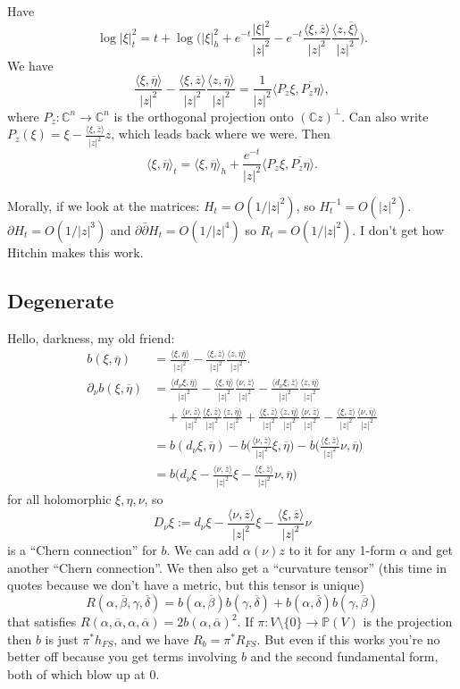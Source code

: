 \documentclass[10pt,a4paper]{amsart}
\newcommand{\kk}[1]{\mathbb{#1}}
\def\<{\langle}
\def\>{\rangle}
\def\ov#1{\overline{#1}}
\begin{document}
Have
$$
\log |\xi|^2_t
= t + \log\biggl(
|\xi|^2_h
+ e^{-t} \frac{|\xi|^2}{|z|^2}
- e^{-t} \frac{\<\xi, \ov z\>}{|z|^2}
\frac{\<z, \ov\xi\>}{|z|^2}
\biggr).
$$
We have
$$
\frac{\<\xi, \ov\eta\>}{|z|^2}
- \frac{\<\xi, \ov z\>}{|z|^2}
\frac{\<z, \ov \eta\>}{|z|^2}
= \frac{1}{|z|^2} \< P_z\xi, \ov{P_z\eta} \>,
$$
where $P_z : \kk C^n \to \kk C^n$ is the orthogonal projection onto $(\kk
C z)^\perp$.
Can also write $P_z(\xi) = \xi - \frac{\<\xi, \ov z\>}{|z|^2} z$,
which leads back where we were.
Then
$$
\<\xi, \ov\eta\>_t
= \<\xi, \ov\eta\>_h
+ \frac{e^{-t}}{|z|^2} \< P_z \xi, \ov{P_z \eta} \>.
$$

Morally, if we look at the matrices:
$H_t = O(1/|z|^2)$, so $H_t^{-1} = O(|z|^2)$.
$\partial H_t = O(1/|z|^3)$ and $\partial\bar\partial H_t = O(1/|z|^4)$
so $R_t=O(1/|z|^2)$.
I don't get how Hitchin makes this work.


\subsection*{Degenerate}

Hello, darkness, my old friend:
\begin{align*}
b(\xi,\ov\eta)
&= \frac{\<\xi, \ov\eta\>}{|z|^2}
- \frac{\<\xi, \ov z\>}{|z|^2}
\frac{\<z, \ov\eta\>}{|z|^2}.
\\
\partial_\nu b(\xi, \ov\eta)
&= \frac{\<d_\nu \xi, \ov\eta\>}{|z|^2}
- \frac{\<\xi, \ov\eta\>}{|z|^2}
\frac{\<\nu, \ov z\>}{|z|^2}
- \frac{\<d_\nu \xi, \ov z\>}{|z|^2}
\frac{\<z, \ov\eta\>}{|z|^2}
\\
&\quad
+
\frac{\<\nu, \ov z\>}{|z|^2}
\frac{\<\xi, \ov z\>}{|z|^2}
\frac{\<z, \ov\eta\>}{|z|^2}
+ \frac{\<\xi, \ov z\>}{|z|^2}
\frac{\<z, \ov\eta\>}{|z|^2}
\frac{\<\nu, \ov z\>}{|z|^2}
- \frac{\<\xi, \ov z\>}{|z|^2}
\frac{\<\nu, \ov\eta\>}{|z|^2}
\\
&= b(d_\nu \xi, \ov\eta)
- b\biggl(\frac{\<\nu, \ov z\>}{|z|^2} \xi , \ov\eta\biggr)
- b\biggl(\frac{\<\xi, \ov z\>}{|z|^2} \nu , \ov\eta\biggr)
\\
&= b\biggl(d_\nu \xi
- \frac{\<\nu, \ov z\>}{|z|^2} \xi
- \frac{\<\xi, \ov z\>}{|z|^2} \nu
, \ov\eta
\biggr)
\end{align*}
for all holomorphic $\xi, \eta, \nu$, so
$$
D_\nu \xi := d_\nu \xi
- \frac{\<\nu, \ov z\>}{|z|^2} \xi
- \frac{\<\xi, \ov z\>}{|z|^2} \nu
$$
is a ``Chern connection'' for $b$.
We can add $\alpha(\nu) z$ to it for any 1-form $\alpha$ and get another
``Chern connection''.
We then also get a ``curvature tensor'' (this time in quotes because we don't
have a metric, but this tensor is unique)
$$
R(\alpha,\ov\beta,\gamma,\ov\delta)
= b(\alpha,\ov\beta) b(\gamma, \ov\delta)
+ b(\alpha,\ov\delta) b(\gamma, \ov\beta)
$$
that satisfies $R(\alpha,\ov\alpha,\alpha,\ov\alpha) = 2b(\alpha,\ov\alpha)^2$.
If $\pi : V \setminus \{ 0 \} \to \kk P(V)$ is the projection then $b$ is just
$\pi^*h_{FS}$, and we have $R_b = \pi^* R_{FS}$.
But even if this works you're no better off because you get terms involving $b$
and the second fundamental form, both of which blow up at $0$.
\end{document}
